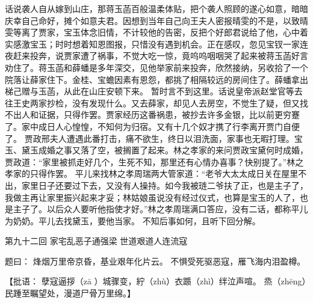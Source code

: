 \documentclass[12pt,oneside]{book}
\begin{document}
话说袭人自从嫁到山庄，那蒋玉菡百般温柔体贴，把个袭人照顾的遂心如意，暗暗庆幸自己命好，摊个如意夫君。因想到当年自己向王夫人密报晴雯的不是，以致晴雯等离了贾家，宝玉体念旧情，不计较他的告密，反把个好郎君说给了他，心中着实感激宝玉；时时想着知恩图报，只惜没有遇到机会。正在感叹，忽见宝钗一家连夜赶来投奔，说贾家遭了祸事，不觉大吃一惊，竟呜呜咽咽哭了起来被蒋玉菡好言劝住了。蒋玉菡和薛蟠是多年深交，见他举家前来投奔，欣然接纳，另收拾了一个院落让薛家住下。金桂、宝蟾因素有恩怨，都挑了相隔较远的房间住了。薛蟠拿出梯己赠与玉菡，从此在山庄安顿下来。
暂时言不到这里。话说皇帝派赵堂官等去往王史两家抄检，没有发现什么。又去薛家，却见人去房空，不觉生了疑，但又找不出人和证据，只得作罢。贾家经历这番祸患，被抄去许多金银，比以前更穷蹇了。家中成日人心惶惶，不知何为归宿。又有十几个奴才携了行李离开贾门自便了。
贾政邢夫人遭遇此番打击，痛不欲生，终日以泪洗面，家事也无暇打理。宝玉、黛玉成婚之事又落了空，被搁置了起来。林之孝家的来问贾政宝黛何时成婚，贾政道：“家里被抓走好几个，生死不知，那里还有心情办喜事？快别提了。”林之孝家的只得作罢。
平儿来找林之孝周瑞两大管家道：“老爷大太太成日关在屋里不出，家里日子还要过下去，又没有人操持。如今我被琏二爷扶了正，也是主子了，我做主再让家里振兴起来才妥；林姑娘虽说没有经过仪式，也算是宝玉的人了，也是主子了。以后众人要听他指使才好。”林之孝周瑞满口答应，没有二话，都称平儿为奶奶。平儿去找黛玉，要他当家。
不知后事如何，且听下回分解。
 
 
第九十二回 家宅乱恶子通强梁 世道艰道人连流寇

题曰：
烽烟万里帝京昏，基业艰年化片云。
不惧受死驱恶寇，雁飞海内泪盈樽。

【批语：
孽寇逼拶（zā ）城骤变，紵（zhù）衣踬（zhì）绊泣声喧。
烝（zhēng）民踵至瞩望处，漫道尸骨万里绵。】
\end{document}
